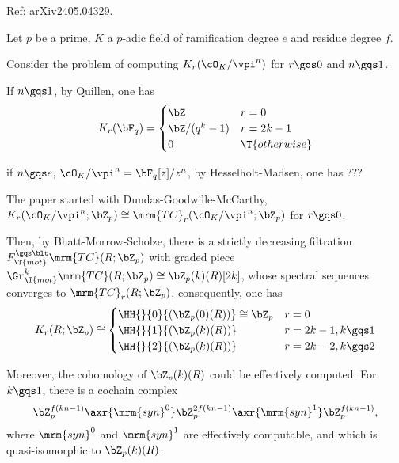 \documentclass[article, a4paper, twoside]{universal}
\begin{document}
\confighead{}{}{}

Ref: arXiv2405.04329.


\begin{stp}
    Let $p$ be a prime, $K$ a $p$-adic field of ramification degree $e$ and residue degree $f$.

    Consider the problem of computing $K_{r}(\cO_{K}/\vpi^{n})$ for $r\gqs0$ and $n\gqs1$.
\end{stp}



If $n\gqs1$, by Quillen\cite{Quillen1972}, one has
\[
    K_{r}(\bF_{q})=\begin{cases}
      \bZ & r = 0 \\
      \bZ/(q^{k}-1) & r = 2k-1 \\
      0 & \T{otherwise}
    \end{cases}
\]

if $n\gqs e$, $\cO_{K}/\vpi^{n}=\bF_{q}[z]/z^{n}$, by Hesselholt-Madsen\cite{HM1997Cyclic}, one has ???



The paper started with Dundas-Goodwille-McCarthy, $K_{r}(\cO_{K}/\vpi^{n};\bZ_{p})\cong\mrm{TC}_{r}(\cO_{K}/\vpi^{n};\bZ_{p})$ for $r\gqs0$.

Then, by Bhatt-Morrow-Scholze, there is a strictly decreasing filtration $F_{\T{mot}}^{\gqs\blt}\mrm{TC}(R;\bZ_{p})$ with graded piece $\Gr_{\T{mot}}^{k}\mrm{TC}(R;\bZ_{p})\cong\bZ_{p}(k)(R)[2k]$, whose spectral sequences converges to $\mrm{TC}_{r}(R;\bZ_{p})$, consequently, one has
\[
    K_{r}(R;\bZ_{p})\cong \begin{cases}
      \HH{}{0}{(\bZ_{p}(0)(R))}\cong \bZ_{p} & r = 0 \\
      \HH{}{1}{(\bZ_{p}(k)(R))} & r=2k-1, k\gqs1 \\
      \HH{}{2}{(\bZ_{p}(k)(R))} & r=2k-2, k\gqs2
    \end{cases}
\]


Moreover, the cohomology of $\bZ_{p}(k)(R)$ could be effectively computed: For $k\gqs1$, there is a cochain complex
\[
    \bZ_{p}^{f(kn-1)}\axr{\mrm{syn}^{0}}\bZ_{p}^{2f(kn-1)}\axr{\mrm{syn}^{1}}\bZ_{p}^{f(kn-1)},
\]
where $\mrm{syn}^{0}$ and $\mrm{syn}^{1}$ are effectively computable, and which is quasi-isomorphic to $\bZ_{p}(k)(R)$.



\printref
\end{document}
